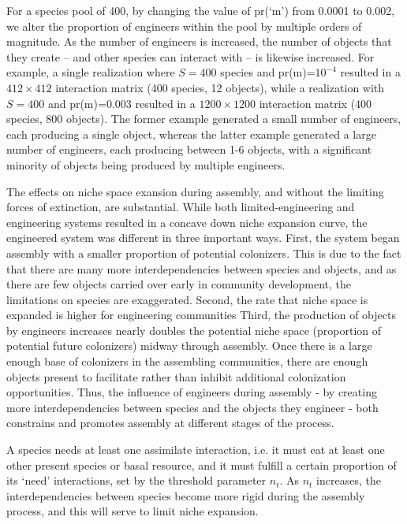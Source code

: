 \documentclass[twocolumn,preprintnumbers,amsmath,amssymb,superscriptaddress]{revtex4}
\begin{document}
For a species pool of 400, by changing the value of pr(`m') from 0.0001 to 0.002, we alter the proportion of engineers within the pool by multiple orders of magnitude.
As the number of engineers is increased, the number of objects that they create -- and other species can interact with -- is likewise increased.
For example, a single realization where $S=400$ species and pr(m)=$10^{-4}$ resulted in a $412\times412$ interaction matrix (400 species, 12 objects), while a realization with $S=400$ and pr(m)=$0.003$ resulted in a $1200\times1200$ interaction matrix (400 species, 800 objects).
The former example generated a small number of engineers, each producing a single object, whereas the latter example generated a large number of engineers, each producing between 1-6 objects, with a significant minority of objects being produced by multiple engineers.

The effects on niche space exansion during assembly, and without the limiting forces of extinction, are substantial.
While both limited-engineering and engineering systems resulted in a concave down niche expansion curve, the engineered system was different in three important ways.
First, the system began assembly with a smaller proportion of potential colonizers.
This is due to the fact that there are many more interdependencies between species and objects, and as there are few objects carried over early in community development, the limitations on species are exaggerated.
Second, the rate that niche space is expanded is higher for engineering communities
Third, the production of objects by engineers increases nearly doubles the potential niche space (proportion of potential future colonizers) midway through assembly.
Once there is a large enough base of colonizers in the assembling communities, there are enough objects present to facilitate rather than inhibit additional colonization opportunities.
Thus, the influence of engineers during assembly - by creating more interdependencies between species and the objects they engineer - both constrains and promotes assembly at different stages of the process.

A species needs at least one assimilate interaction, i.e. it must eat at least one other present species or basal resource, and it must fulfill a certain proportion of its `need' interactions, set by the threshold parameter $n_t$.
As $n_t$ increases, the interdependencies between species become more rigid during the assembly process, and this will serve to limit niche expansion.
\end{document}
